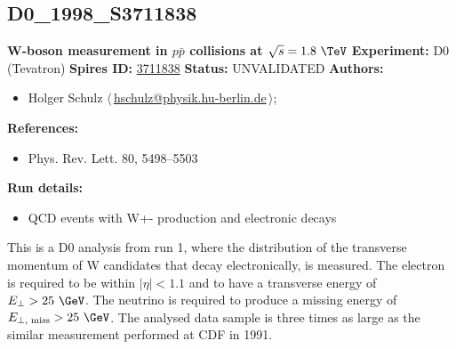 \subsection[D0\_1998\_S3711838]{D0\_1998\_S3711838\,\cite{Abbott:1998jy}}
\textbf{W-boson \pT measurement in $p\bar{p}$ collisions at $\sqrt{s}=1.8~\TeV$}\newline
\textbf{Experiment:} D0 (Tevatron) \newline
\textbf{Spires ID:} \href{http://www.slac.stanford.edu/spires/find/hep/www?rawcmd=key+3711838}{3711838}\newline
\textbf{Status:} UNVALIDATED\newline
\textbf{Authors:}
\begin{itemize}
  \item Holger Schulz $\langle\,$\href{mailto:hschulz@physik.hu-berlin.de}{hschulz@physik.hu-berlin.de}$\,\rangle$;
\end{itemize}
\textbf{References:}
\begin{itemize}
  \item Phys. Rev. Lett. 80, 5498–5503
\end{itemize}
\textbf{Run details:}
\begin{itemize}

  \item QCD events with W+- production and electronic decays\end{itemize}

\noindent This is a D0 analysis from run 1, where the distribution of the transverse momentum of W candidates that decay  electronically, is measured. The electron is required to be within $\left|\eta\right| < 1.1$ and to have a transverse energy of $E_\perp > 25~\GeV$.  The neutrino is required to produce a missing energy of $E_{\perp, \text{ miss}}>25~\GeV$. The analysed data sample is three times as large as the similar measurement performed at CDF in 1991.

\clearpage


\clearpage

